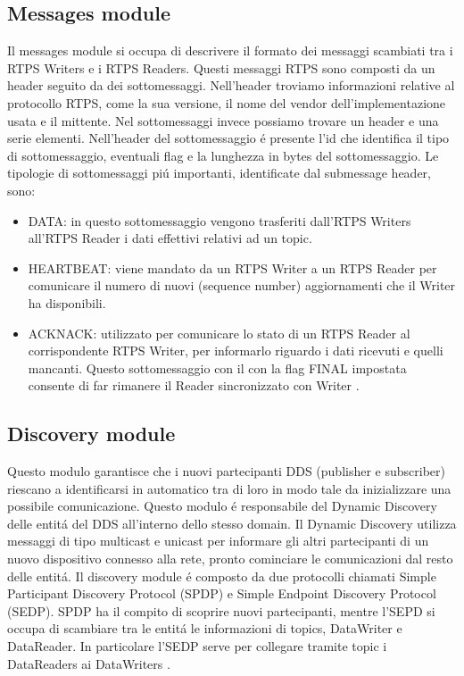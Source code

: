 \subsection{Messages module}
Il messages module si occupa di descrivere il formato dei messaggi scambiati
tra i RTPS Writers e i RTPS Readers. Questi messaggi RTPS sono composti da un header
seguito da dei sottomessaggi. Nell'header troviamo informazioni relative al
protocollo RTPS, come la sua versione, il nome del vendor dell'implementazione
usata e il mittente. Nel sottomessaggi invece possiamo trovare un header
e una serie elementi. Nell'header del sottomessaggio
é presente l'id che 
identifica il tipo di sottomessaggio, eventuali flag e la lunghezza in bytes 
del sottomessaggio. Le tipologie di sottomessaggi piú importanti, identificate
dal submessage header, sono:
\begin{itemize}
    \item DATA: in questo sottomessaggio vengono trasferiti dall'RTPS Writers
    all'RTPS Reader i dati effettivi relativi ad un topic.
    \item HEARTBEAT: viene mandato da un RTPS Writer a un RTPS Reader per 
    comunicare il numero di nuovi (sequence number) aggiornamenti che il 
    Writer ha disponibili.
    \item ACKNACK: utilizzato per comunicare lo stato di un RTPS Reader 
    al corrispondente RTPS Writer, per informarlo riguardo i dati ricevuti
    e quelli mancanti. Questo sottomessaggio con il con la flag FINAL 
    impostata consente di far rimanere il Reader sincronizzato con 
    Writer \cite{ddsrtps}.
\end{itemize}


\subsection{Discovery module}
Questo modulo garantisce che i nuovi partecipanti DDS (publisher e subscriber)
riescano a identificarsi in automatico tra di loro in modo tale da inizializzare una 
possibile comunicazione. Questo modulo é responsabile del Dynamic Discovery
delle entitá del DDS all'interno dello stesso domain. Il Dynamic Discovery
utilizza messaggi di tipo multicast e unicast per informare gli altri partecipanti
di un nuovo dispositivo connesso alla rete, pronto cominciare le comunicazioni
dal resto delle entitá. Il discovery module é composto da due protocolli chiamati
Simple Participant Discovery Protocol (SPDP) e 
Simple Endpoint Discovery Protocol (SEDP). SPDP ha il compito di scoprire nuovi 
partecipanti, mentre l'SEPD si occupa di scambiare tra le entitá le informazioni
di topics, DataWriter e DataReader. In particolare l'SEDP serve per collegare
tramite topic i DataReaders ai DataWriters \cite{ddsrtps}.

